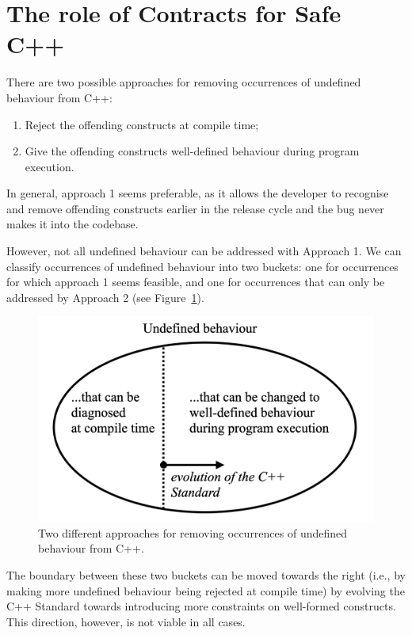 \section{The role of Contracts for Safe C++}
\label{role}

There are two possible approaches for removing occurrences of undefined behaviour from C++:
\begin{enumerate}
\item Reject the offending constructs at compile time;
\item Give the offending constructs well-defined behaviour during program execution.
\end{enumerate}
In general, approach 1 seems preferable, as it allows the developer to recognise and remove offending constructs earlier in the release cycle and the bug never makes it into the codebase.

However, not all undefined behaviour can be addressed with Approach 1. We can classify occurrences of undefined behaviour into two buckets: one for occurrences for which approach 1 seems feasible, and one for occurrences that can only be addressed by Approach 2 (see Figure~\ref{fig_buckets}).

\begin{figure}[b]
\begin{center}
\includegraphics[scale=0.29]{images/p3100_buckets.png}
\end{center}
\caption{Two different approaches for removing occurrences of undefined behaviour from C++.}
\label{fig_buckets}
\end{figure}

The boundary between these two buckets can be moved towards the right (i.e., by making more undefined behaviour being rejected at compile time) by evolving the C++ Standard towards introducing more constraints on well-formed constructs. This direction, however, is not viable in all cases.

